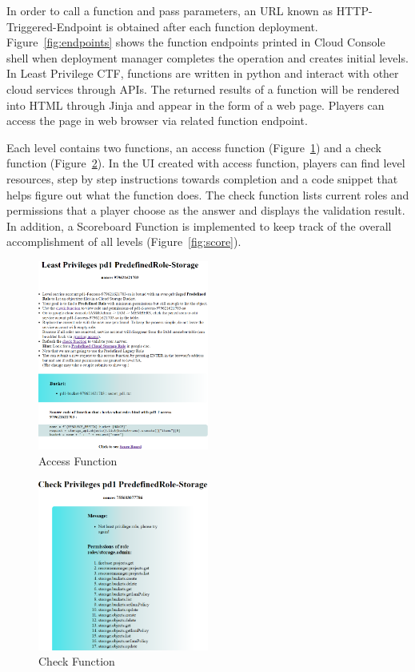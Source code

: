In order to call a function and pass parameters, an URL known as HTTP-Triggered-Endpoint is obtained after each function deployment. Figure~\ref{fig:endpoints} shows the function endpoints printed in Cloud Console shell when deployment manager completes the operation and creates initial levels. In Least Privilege CTF, functions are written in python and interact with other cloud services through APIs. The returned results of a function will be rendered into HTML through Jinja and appear in the form of a web page. Players can access the page in web browser via related function endpoint.

Each level contains two functions, an access function (Figure~\ref{fig:access}) and a check function (Figure~\ref{fig:check}). In the UI created with access function, players can find level resources, step by step instructions towards completion and a code snippet that helps figure out what the function does. The check function lists current roles and permissions that a player choose as the answer and displays the validation result. In addition,  a Scoreboard Function is implemented to keep track of the overall accomplishment of all levels (Figure~\ref{fig:score}).  
\begin{figure}[!h]
  \centering
  \includegraphics[width=0.5\textwidth]{pic/access}
  \caption {Access Function}
  \label{fig:access}
\end{figure}
\begin{figure}[!h]
  \centering
  \includegraphics[width=0.5\textwidth]{pic/check}
  \caption {Check Function}
  \label{fig:check}
\end{figure}

